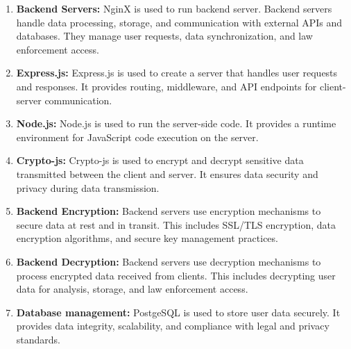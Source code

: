 \begin{enumerate}[label=\roman*.]

    \item \textbf{Backend Servers:} NginX is used to run backend server. Backend servers handle data processing, storage, and communication with external APIs and databases. They manage user requests, data synchronization, and law enforcement access.
    
    \item \textbf{Express.js:} Express.js is used to create a server that handles user requests and responses. It provides routing, middleware, and API endpoints for client-server communication.
    \item \textbf{Node.js:} Node.js is used to run the server-side code. It provides a runtime environment for JavaScript code execution on the server.
    \item \textbf{Crypto-js:} Crypto-js is used to encrypt and decrypt sensitive data transmitted between the client and server. It ensures data security and privacy during data transmission.
    \item \textbf{Backend Encryption:} Backend servers use encryption mechanisms to secure data at rest and in transit. This includes SSL/TLS encryption, data encryption algorithms, and secure key management practices.
    \item \textbf{Backend Decryption:} Backend servers use decryption mechanisms to process encrypted data received from clients. This includes decrypting user data for analysis, storage, and law enforcement access.
    \item \textbf{Database management:} PostgeSQL is used to store user data securely. It provides data integrity, scalability, and compliance with legal and privacy standards.
\end{enumerate}
